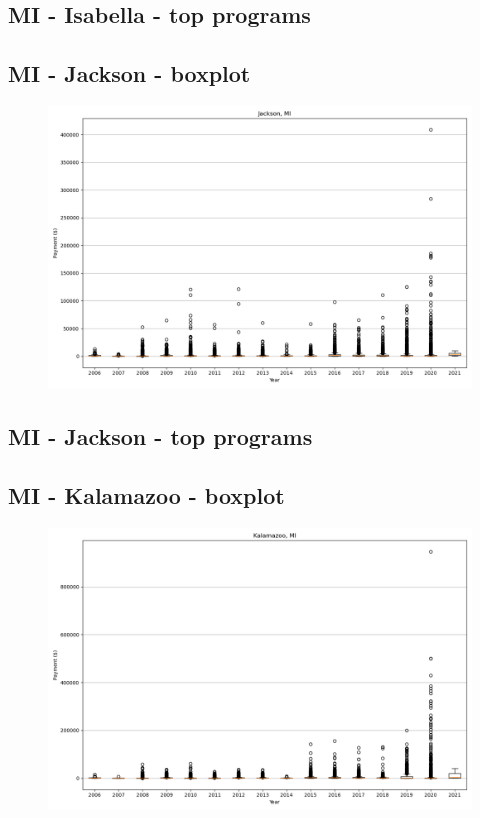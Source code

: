 \subsection*{MI - Isabella - top programs}

\newpage
\subsection*{MI - Jackson - boxplot}
\begin{figure}[h]
\centering
\includegraphics[width=7in]{../output/boxplots/counties/Jackson-MI_boxplot.png}
\end{figure}


\subsection*{MI - Jackson - top programs}

\newpage
\subsection*{MI - Kalamazoo - boxplot}
\begin{figure}[h]
\centering
\includegraphics[width=7in]{../output/boxplots/counties/Kalamazoo-MI_boxplot.png}
\end{figure}


